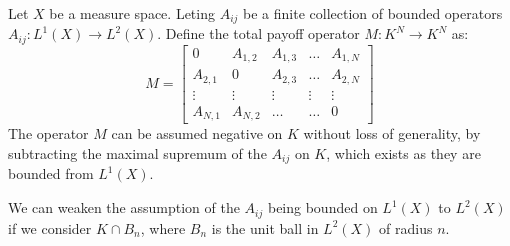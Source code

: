 \begin{definition}
  Let $X$ be a measure space. Leting $A_{ij}$ be a finite collection of bounded operators $A_{ij}: L^1(X) \to L^2(X)$. Define the total payoff operator $M:K^N \to K^N$ as:
  \begin{equation}
    M =
    \begin{bmatrix}
        0 & A_{1,2} & A_{1,3} &\dots & A_{1,N} \\
        A_{2,1} & 0 & A_{2,3} &\dots & A_{2,N} \\
        \vdots & \vdots & \vdots & \vdots & \vdots \\
        A_{N,1} & A_{N,2} & \dots & \dots & 0
    \end{bmatrix}
  \end{equation}
  The operator $M$ can be assumed negative on $K$ without loss of generality, by subtracting the maximal supremum of the $A_{ij}$ on $K$, which exists as they are bounded from $L^1(X)$.
\end{definition}
\begin{remark}
  We can weaken the assumption of the $A_{ij}$ being bounded on $L^1(X)$ to $L^2(X)$ if we consider $K\cap B_n$, where $B_n$ is the unit ball in $L^2(X)$ of radius $n$.
\end{remark}


